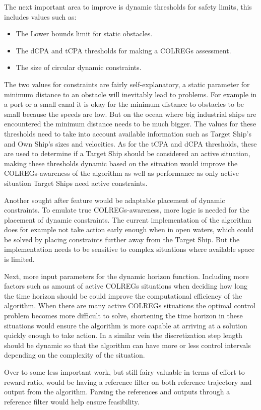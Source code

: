 The next important area to improve is dynamic thresholds for safety limits, this includes values such as:
\begin{itemize}
    \item The Lower bounds limit for static obstacles.
    \item The dCPA and tCPA thresholds for making a COLREGs assessment.
    \item The size of circular dynamic constraints.
\end{itemize}
The two values for constraints are fairly self-explanatory, a static parameter for minimum distance to an obstacle will inevitably lead to problems. For example in a
port or a small canal it is okay for the minimum distance to obstacles to be small because the speeds are low. But on the ocean where big industrial ships are encountered
the minimum distance needs to be much bigger. The values for these thresholds need to take into account available information such as Target Ship's and Own Ship's sizes and velocities.
As for the tCPA and dCPA thresholds, these are used to determine if a Target Ship should be considered an active situation, making these thresholds dynamic based on the situation would improve
the COLREGs-awareness of the algorithm as well as performance as only active situation Target Ships need active constraints.

Another sought after feature would be adaptable placement of dynamic constraints. To emulate true COLREGs-awareness, more logic is needed for the placement of dynamic constraints. 
The current implementation of the algorithm does for example not take action early enough when in open waters, 
which could be solved by placing constraints further away from the Target Ship. But the implementation needs to be sensitive to complex situations where available space is limited.

Next, more input parameters for the dynamic horizon function. Including more factors such as amount of active COLREGs situations when deciding how long the time horizon should be
could improve the computational efficiency of the algorithm. When there are many active COLREGs situations the optimal control problem becomes more difficult to solve, shortening
the time horizon in these situations would ensure the algorithm is more capable at arriving at a solution quickly enough to take action. In a similar vein the discretization step
length should be dynamic so that the algorithm can have more or less control intervals depending on the complexity of the situation.

Over to some less important work, but still fairy valuable in terms of effort to reward ratio, would be having a reference filter on both reference trajectory and output from the algorithm.
Parsing the references and outputs through a reference filter would help ensure feasibility.



\newpage